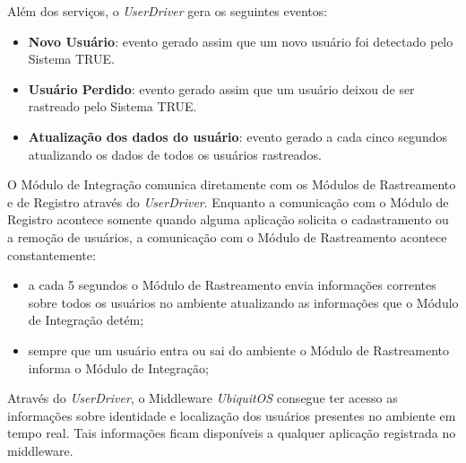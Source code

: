 Além dos serviços, o \textit{UserDriver} gera os seguintes eventos:

	\begin{itemize}
		\item \textbf{Novo Usuário}: evento gerado assim que um novo usuário foi detectado pelo Sistema TRUE.
		\item \textbf{Usuário Perdido}: evento gerado assim que um usuário deixou de ser rastreado pelo Sistema TRUE.
		\item \textbf{Atualização dos dados do usuário}: evento gerado a cada cinco segundos atualizando os dados de todos os usuários rastreados.
	\end{itemize}

	O Módulo de Integração comunica diretamente com os Módulos de Rastreamento e de
	Registro através do \textit{UserDriver}. Enquanto a comunicação com o Módulo de
	Registro acontece somente quando alguma aplicação solicita o cadastramento ou a remoção
	de usuários, a comunicação com o Módulo de Rastreamento acontece
	constantemente:

	\begin{itemize}
		\item a cada 5 segundos o Módulo de Rastreamento envia informações correntes sobre todos os usuários no ambiente atualizando as informações que o Módulo de Integração detém;
		\item sempre que um usuário entra ou sai do ambiente o Módulo de Rastreamento informa o Módulo de Integração;
	\end{itemize} 

Através do \textit{UserDriver}, o Middleware \textit{UbiquitOS} consegue ter acesso as informações sobre identidade e localização dos usuários presentes no ambiente em tempo real. Tais informações ficam disponíveis a qualquer aplicação registrada no middleware. 
